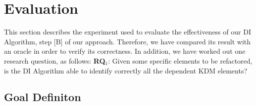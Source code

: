 
\section{Evaluation}\label{sec:evaluation}

This section describes the experiment used to evaluate the effectiveness of our DI Algorithm, step [B] of our approach. Therefore, we have compared its result with an oracle in order to verify its correctness. %
In addition, we have worked out one research question, as follows:
%
%
\textbf{RQ$_{1}$}: Given some specific elements to be refactored, is the DI Algorithm able to identify correctly all the dependent KDM elements?

 

\subsection{Goal Definiton}\label{sec:goal_definition}


